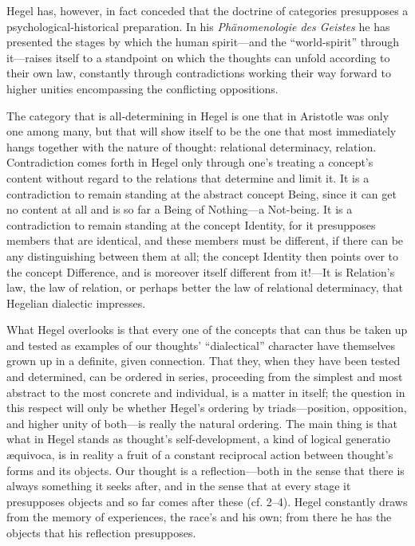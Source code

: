 \documentclass[12pt,a4paper]{book}
\newcommand{\opage}[1]{\marginnote{\footnotesize\textit{[#1]}}}
\begin{document}
Hegel has, however, in fact conceded that the doctrine of categories
presupposes a psychological-historical preparation. In his \emph{Phänomenologie
des Geistes} he has presented the stages by which the human spirit---and the
``world-spirit'' through it---raises itself to a standpoint on which the
thoughts can unfold according to their own law, constantly through
contradictions working their way forward to higher unities encompassing the
conflicting oppositions.

The category that is all-determining in Hegel is one that in Aristotle was
only one among many, but that will \opage{148}show itself to be the one that most
immediately hangs together with the nature of thought: relational
determinacy, relation. Contradiction comes forth in Hegel only through one's
treating a concept's content without regard to the relations that determine
and limit it. It is a contradiction to remain standing at the abstract
concept Being, since it can get no content at all and is so far a Being of
Nothing---a Not-being. It is a contradiction to remain standing at the
concept Identity, for it presupposes members that are identical, and these
members must be different, if there can be any distinguishing between them at
all; the concept Identity then points over to the concept Difference, and is
moreover itself different from it!---It is Relation's law, the law of
relation, or perhaps better the law of relational determinacy, that
Hegelian dialectic impresses.

What Hegel overlooks is that every one of the concepts that can thus be
taken up and tested as examples of our thoughts' ``dialectical'' character
have themselves grown up in a definite, given connection. That they, when
they have been tested and determined, can be ordered in series, proceeding
from the simplest and most abstract to the most concrete and individual, is
a matter in itself; the question in this respect will only be whether Hegel's
ordering by triads---position, opposition, and higher unity of both---is
really the natural ordering. The main thing is that what in Hegel stands as
thought's self-development, a kind of logical generatio æquivoca, is in
reality a fruit of a constant reciprocal action between thought's forms and
its objects. Our thought is a reflection---both in the sense that there is
always something it seeks after, and in the sense that at every stage it
presupposes objects and so far comes after these (cf. 2--4). Hegel constantly
draws from the memory of experiences, the race's and his own; from there he
has the objects that his reflection presupposes.
\end{document}
